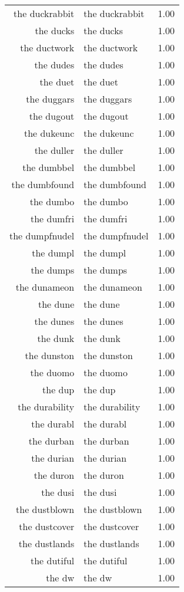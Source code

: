 \begin{table}[ht]
\begin{tabular}{rlr}
  the duckrabbit & the duckrabbit & 1.00 \\ 
  the ducks & the ducks & 1.00 \\ 
  the ductwork & the ductwork & 1.00 \\ 
  the dudes & the dudes & 1.00 \\ 
  the duet & the duet & 1.00 \\ 
  the duggars & the duggars & 1.00 \\ 
  the dugout & the dugout & 1.00 \\ 
  the dukeunc & the dukeunc & 1.00 \\ 
  the duller & the duller & 1.00 \\ 
  the dumbbel & the dumbbel & 1.00 \\ 
  the dumbfound & the dumbfound & 1.00 \\ 
  the dumbo & the dumbo & 1.00 \\ 
  the dumfri & the dumfri & 1.00 \\ 
  the dumpfnudel & the dumpfnudel & 1.00 \\ 
  the dumpl & the dumpl & 1.00 \\ 
  the dumps & the dumps & 1.00 \\ 
  the dunameon & the dunameon & 1.00 \\ 
  the dune & the dune & 1.00 \\ 
  the dunes & the dunes & 1.00 \\ 
  the dunk & the dunk & 1.00 \\ 
  the dunston & the dunston & 1.00 \\ 
  the duomo & the duomo & 1.00 \\ 
  the dup & the dup & 1.00 \\ 
  the durability & the durability & 1.00 \\ 
  the durabl & the durabl & 1.00 \\ 
  the durban & the durban & 1.00 \\ 
  the durian & the durian & 1.00 \\ 
  the duron & the duron & 1.00 \\ 
  the dusi & the dusi & 1.00 \\ 
  the dustblown & the dustblown & 1.00 \\ 
  the dustcover & the dustcover & 1.00 \\ 
  the dustlands & the dustlands & 1.00 \\ 
  the dutiful & the dutiful & 1.00 \\ 
  the dw & the dw & 1.00 \\ 

\end{tabular}
\end{table}
